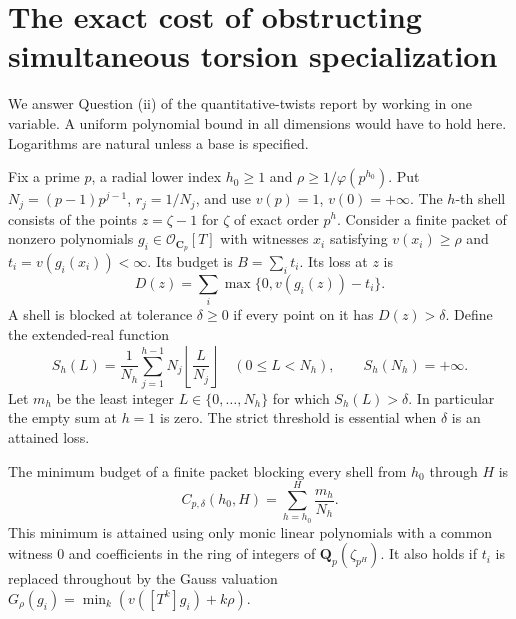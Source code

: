 \section{The exact cost of obstructing simultaneous torsion specialization}
\label{sec:torsion-minimax}

We answer Question (ii) of the quantitative-twists report by working in one variable. A uniform polynomial bound in all dimensions would have to hold here. Logarithms are natural unless a base is specified.

Fix a prime $p$, a radial lower index $h_0\ge1$ and $\rho\ge
1/\varphi(p^{h_0})$. Put $N_j=(p-1)p^{j-1}$, $r_j=1/N_j$, and use
$v(p)=1$, $v(0)=+\infty$. The $h$-th shell consists of the points
$z=\zeta-1$ for $\zeta$ of exact order $p^h$. Consider a finite packet of
nonzero polynomials $g_i\in\mathcal O_{\mathbf C_p}[T]$ with witnesses
$x_i$ satisfying $v(x_i)\ge\rho$ and $t_i=v(g_i(x_i))<\infty$. Its
budget is $B=\sum_i t_i$. Its loss at $z$ is
\[
             D(z)=\sum_i\max\{0,v(g_i(z))-t_i\}.
\]
A shell is blocked at tolerance $\delta\ge0$ if every point on it has
$D(z)>\delta$. Define the extended-real function
\[
 S_h(L)=\frac1{N_h}\sum_{j=1}^{h-1}N_j\left\lfloor\frac{L}{N_j}\right\rfloor
 \quad(0\le L<N_h),\qquad S_h(N_h)=+\infty .
\]
Let $m_h$ be the least integer $L\in\{0,\ldots,N_h\}$ for which $S_h(L)>\delta$.
In particular the empty sum at $h=1$ is zero. The strict threshold is
essential when $\delta$ is an attained loss.

\begin{theorem}\label{thm:exact-obstruction}
The minimum budget of a finite packet blocking every shell from $h_0$
through $H$ is
\[
              C_{p,\delta}(h_0,H)=\sum_{h=h_0}^{H}\frac{m_h}{N_h}.
\]
This minimum is attained using only monic linear polynomials with a common
witness $0$ and coefficients in the ring of integers of
$\mathbf Q_p(\zeta_{p^H})$. It also holds if $t_i$ is replaced throughout by
the Gauss valuation $G_\rho(g_i)=\min_k(v([T^k]g_i)+k\rho)$.
\end{theorem}

